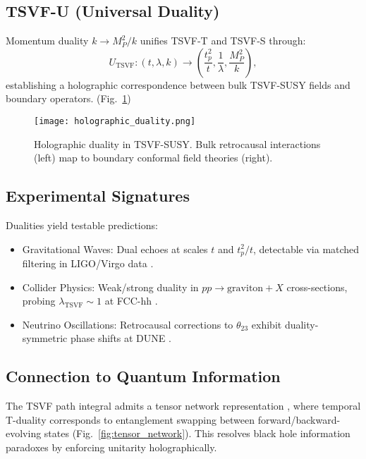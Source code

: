 \documentclass[twocolumn,superscriptaddress,floatfix]{revtex4-2}
\begin{document}
\subsection{TSVF-U (Universal Duality)}  
\label{subsec:u_duality}  

Momentum duality $k \to M_P^2/k$ unifies TSVF-T and TSVF-S through:
\begin{equation}
U_{\text{TSVF}}: (t, \lambda, k) \rightarrow \left(\frac{t_p^2}{t}, \frac{1}{\lambda}, \frac{M_P^2}{k}\right),
\end{equation}
establishing a holographic correspondence between bulk TSVF-SUSY fields and boundary operators.  (Fig.~\ref{fig:holography})

\begin{figure}[htbp]  
\centering  
\texttt{[image: holographic\_duality.png]}  
\caption{Holographic duality in TSVF-SUSY. Bulk retrocausal interactions (left) map to boundary conformal field theories (right).}  
\label{fig:holography}  
\end{figure}  

\subsection{Experimental Signatures}  
\label{subsec:duality_signatures}  

Dualities yield testable predictions:
\begin{itemize}
\item Gravitational Waves: Dual echoes at scales $t$ and $t_p^2/t$, detectable via matched filtering in LIGO/Virgo data \cite{LSC2021}.
\item Collider Physics: Weak/strong duality in $pp \to \text{graviton} + X$ cross-sections, probing $\lambda_{\text{TSVF}} \sim 1$ at FCC-hh \cite{Abada2019}.
\item Neutrino Oscillations: Retrocausal corrections to $\theta_{23}$ exhibit duality-symmetric phase shifts at DUNE \cite{Abi2021}.
\end{itemize}

\subsection{Connection to Quantum Information}  
\label{subsec:quantum_info}  

The TSVF path integral admits a tensor network representation \cite{Swingle2012}, where temporal T-duality corresponds to entanglement swapping between forward/backward-evolving states (Fig.~\ref{fig:tensor_network}). This resolves black hole information paradoxes \cite{Almheiri2020} by enforcing unitarity holographically.  
\end{document}

